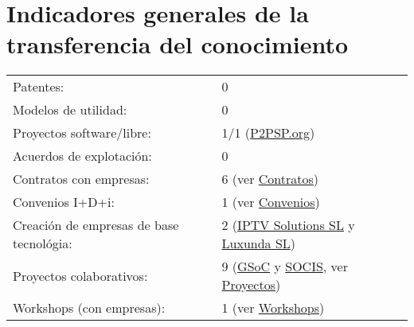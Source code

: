 \documentclass[a4paper]{article}
\begin{document}
\section*{Indicadores generales de la transferencia del conocimiento}
\begin{tabular}{ll}
Patentes: & 0 \\
Modelos de utilidad: & 0 \\
Proyectos software/libre: & 1/1 (\href{https://www.p2psp.org}{P2PSP.org}) \\
Acuerdos de explotación: & 0 \\
Contratos con empresas: & 6 (ver \hyperref[sec:contratos]{Contratos})\\
Convenios I+D+i: & 1 (ver \hyperref[sec:convenios]{Convenios}) \\
Creación de empresas de base tecnológia: & 2 (\href{http://www.infocif.es/ficha-empresa/iptv-solutions-sl}{IPTV Solutions SL} y \href{http://www.luxunda.es/}{Luxunda SL})\\
Proyectos colaborativos: & 9 (\href{https://summerofcode.withgoogle.com}{GSoC} y \href{https://www.esa.int/Our_Activities/Space_Engineering_Technology/SOCIS_The_ESA_Summer_of_Code_in_Space}{SOCIS}, ver \hyperref[sec:proyectos]{Proyectos}) \\
Workshops (con empresas): & 1 (ver \hyperref[sec:workshops]{Workshops})
\end{tabular}

%
\end{document}
